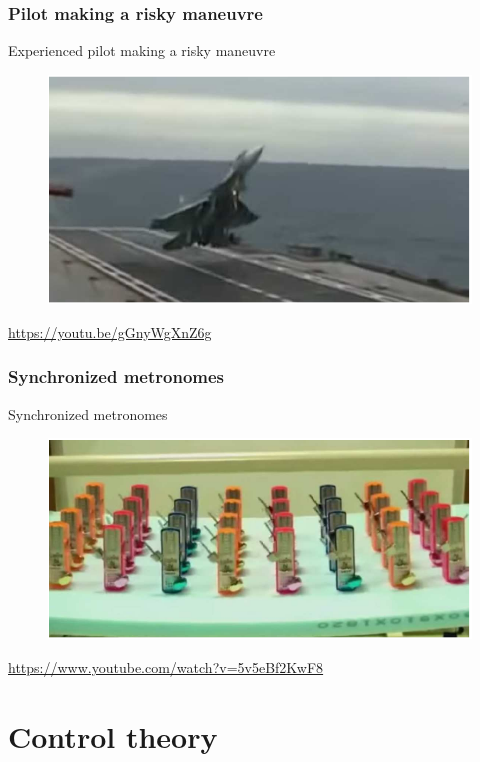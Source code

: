 \documentclass{beamer}
\begin{document}
\begin{frame}
\frametitle{Pilot making a risky maneuvre}
Experienced pilot making a risky maneuvre
\begin{figure}
\includegraphics[scale=0.7]{risky_maneuvre}
\end{figure}
\url{https://youtu.be/gGnyWgXnZ6g}
\end{frame}


\begin{frame}
\frametitle{Synchronized metronomes}
Synchronized metronomes
\begin{figure}
\includegraphics[scale=0.8]{synchronized_metronomes}
\end{figure}
\url{https://www.youtube.com/watch?v=5v5eBf2KwF8}
\end{frame}

\section{Control theory}
\end{document}
